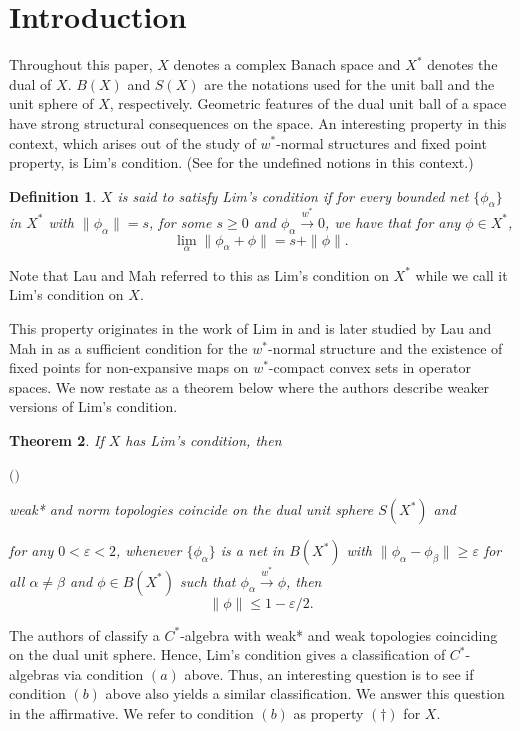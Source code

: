 \documentclass[11pt]{amsart}
\newcommand{\e}{\varepsilon}
\newcounter{cnt1}
\newcounter{cnt2}
\newcommand{\bla}{\begin{list}{$($\alph{cnt2}$)$}
 {\usecounter{cnt2} \setlength{\topsep}{0pt}
 \setlength{\itemsep}{0pt}}}
\newcommand{\el}{\end{list}}
\newtheorem{thm}{Theorem}
\newtheorem{Def}[thm]{Definition}
\begin{document}
\section{Introduction} 
Throughout this paper, $X$ denotes a complex Banach space and $X^*$ denotes the dual of $X$. $B(X)$ and $S(X)$ are the notations used for the unit ball and the unit sphere of $X$, respectively. Geometric features of the dual unit ball of a space have strong structural consequences on the space. An interesting property in this context, which arises out of the study of $w^*$-normal structures and fixed point property, is Lim's condition. (See \cite{Lim} for the undefined notions in this context.)
\begin{Def}
  $X$ is said to satisfy Lim's condition if for every bounded net $\{\phi_{\alpha}\}$ in $X^*$ with $\|\phi_{\alpha}\|=s$, for some $s \geq 0$ and $\phi_{\alpha} \xrightarrow{w^*} 0$, we have that for any $\phi \in X^*$,
\[
\lim_{\alpha}\|\phi_{\alpha}+\phi\|=s + \|\phi\|.
\]  
\end{Def}
Note that Lau and Mah referred to this as Lim's condition on $X^*$ while we call it Lim's condition on $X$.

This property originates in the work of Lim in \cite[Theorem 2]{Lim} and is later studied by Lau and Mah in \cite{LM} as a sufficient condition for the $w^*$-normal structure and the existence of fixed points for non-expansive maps on $w^*$-compact convex sets in operator spaces. We now restate \cite[Lemma 4]{LM} as a theorem below where the authors describe weaker versions of Lim's condition.
\begin{thm}
If $X$ has Lim's condition, then
\bla
\item weak* and norm topologies coincide on the dual unit sphere $S(X^*)$ and

\item for any $0 <\e <2$, whenever $\{\phi_{\alpha}\}$ is a net in $B(X^*)$ with $\|\phi_{\alpha}-\phi_{\beta}\| \geq \e$ for all $\alpha \neq \beta$ and $\phi \in B(X^*)$ such that $\phi_{\alpha} \xrightarrow{w^\ast} \phi$, then
\[
\|\phi\| \leq 1 - \e/2.
\]
\el
\end{thm}

The authors of \cite[Theorem 2]{CPW} classify a $C^*$-algebra with weak* and weak topologies coinciding on the dual unit sphere. Hence, Lim's condition gives a classification of $C^*$-algebras via condition $(a)$ above. Thus, an interesting question is to see if condition $(b)$ above also yields a similar classification. We answer this question in the affirmative. We refer to condition $(b)$ as property $(\dag)$ for $X$.
\end{document}
